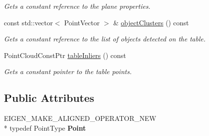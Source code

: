 \begin{DoxyCompactItemize}
\begin{DoxyCompactList}\small\item\em Gets a constant reference to the plane properties. \end{DoxyCompactList}\item 
\hypertarget{classope_1_1_table_object_detector_ad09959876eacf31ab2e97906dc02c0a4}{const std\-::vector$<$ Point\-Vector $>$ \& \hyperlink{classope_1_1_table_object_detector_ad09959876eacf31ab2e97906dc02c0a4}{object\-Clusters} () const }\label{classope_1_1_table_object_detector_ad09959876eacf31ab2e97906dc02c0a4}

\begin{DoxyCompactList}\small\item\em Gets a constant reference to the list of objects detected on the table. \end{DoxyCompactList}\item 
\hypertarget{classope_1_1_table_object_detector_a8278804d04b8efdf1111bea658de0fc9}{Point\-Cloud\-Const\-Ptr \hyperlink{classope_1_1_table_object_detector_a8278804d04b8efdf1111bea658de0fc9}{table\-Inliers} () const }\label{classope_1_1_table_object_detector_a8278804d04b8efdf1111bea658de0fc9}

\begin{DoxyCompactList}\small\item\em Gets a constant pointer to the table points. \end{DoxyCompactList}\end{DoxyCompactItemize}
\subsection*{Public Attributes}
\begin{DoxyCompactItemize}
\item 
\hypertarget{classope_1_1_table_object_detector_ad3a450f6f49bd8cc7c286dede4f768a0}{E\-I\-G\-E\-N\-\_\-\-M\-A\-K\-E\-\_\-\-A\-L\-I\-G\-N\-E\-D\-\_\-\-O\-P\-E\-R\-A\-T\-O\-R\-\_\-\-N\-E\-W \\*
typedef Point\-Type {\bfseries Point}}\label{classope_1_1_table_object_detector_ad3a450f6f49bd8cc7c286dede4f768a0}

\end{DoxyCompactItemize}
